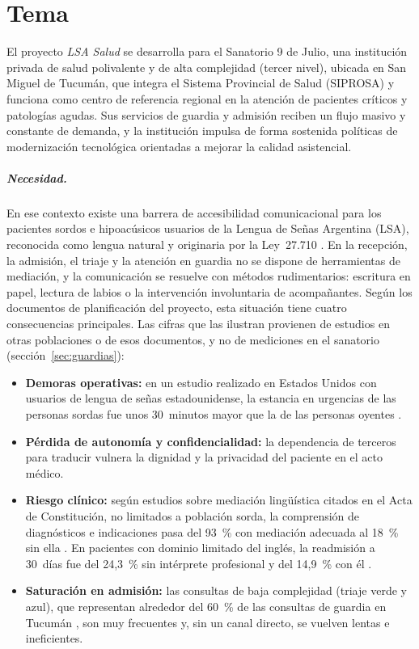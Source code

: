\chapter{Tema}

El proyecto \emph{LSA Salud} se desarrolla para el Sanatorio 9 de Julio, una institución privada de salud polivalente y de alta complejidad (tercer nivel), ubicada en San Miguel de Tucumán, que integra el Sistema Provincial de Salud (SIPROSA) y funciona como centro de referencia regional en la atención de pacientes críticos y patologías agudas. Sus servicios de guardia y admisión reciben un flujo masivo y constante de demanda, y la institución impulsa de forma sostenida políticas de modernización tecnológica orientadas a mejorar la calidad asistencial.

\paragraph{Necesidad.} En ese contexto existe una barrera de accesibilidad comunicacional para los pacientes sordos e hipoacúsicos usuarios de la Lengua de Señas Argentina (LSA), reconocida como lengua natural y originaria por la Ley~27.710 \parencite{ley27710}. En la recepción, la admisión, el triaje y la atención en guardia no se dispone de herramientas de mediación, y la comunicación se resuelve con métodos rudimentarios: escritura en papel, lectura de labios o la intervención involuntaria de acompañantes. Según los documentos de planificación del proyecto, esta situación tiene cuatro consecuencias principales. Las cifras que las ilustran provienen de estudios en otras poblaciones o de esos documentos, y no de mediciones en el sanatorio (sección~\ref{sec:guardias}):
\begin{itemize}
  \item \textbf{Demoras operativas:} en un estudio realizado en Estados Unidos con usuarios de lengua de señas estadounidense, la estancia en urgencias de las personas sordas fue unos 30~minutos mayor que la de las personas oyentes \parencite{james2022ed}.
  \item \textbf{Pérdida de autonomía y confidencialidad:} la dependencia de terceros para traducir vulnera la dignidad y la privacidad del paciente en el acto médico.
  \item \textbf{Riesgo clínico:} según estudios sobre mediación lingüística citados en el Acta de Constitución, no limitados a población sorda, la comprensión de diagnósticos e indicaciones pasa del 93~\% con mediación adecuada al 18~\% sin ella \parencite{actaconstitucion2026}. En pacientes con dominio limitado del inglés, la readmisión a 30~días fue del 24,3~\% sin intérprete profesional y del 14,9~\% con él \parencite{lindholm2012}.
  \item \textbf{Saturación en admisión:} las consultas de baja complejidad (triaje verde y azul), que representan alrededor del 60~\% de las consultas de guardia en Tucumán \parencite{solicitudtema2026}, son muy frecuentes y, sin un canal directo, se vuelven lentas e ineficientes.
\end{itemize}

